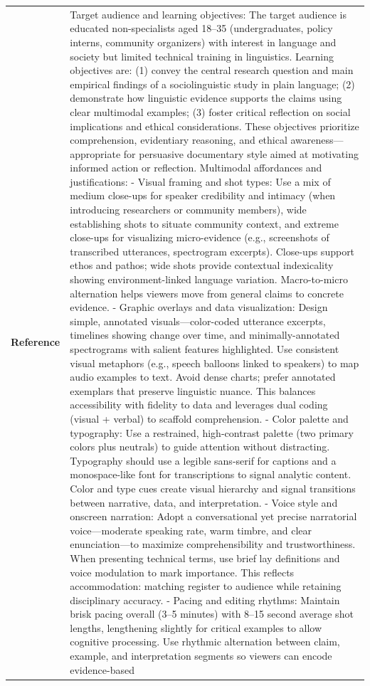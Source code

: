 \begin{longtable}{@{}l p{13cm}@{}}
  \textbf{Reference} & Target audience and learning objectives: The target audience is educated non-specialists aged 18--35 (undergraduates, policy interns, community organizers) with interest in language and society but limited technical training in linguistics. Learning objectives are: (1) convey the central research question and main empirical findings of a sociolinguistic study in plain language; (2) demonstrate how linguistic evidence supports the claims using clear multimodal examples; (3) foster critical reflection on social implications and ethical considerations. These objectives prioritize comprehension, evidentiary reasoning, and ethical awareness---appropriate for persuasive documentary style aimed at motivating informed action or reflection. \newline Multimodal affordances and justifications: \newline - Visual framing and shot types: Use a mix of medium close-ups for speaker credibility and intimacy (when introducing researchers or community members), wide establishing shots to situate community context, and extreme close-ups for visualizing micro-evidence (e.g., screenshots of transcribed utterances, spectrogram excerpts). Close-ups support ethos and pathos; wide shots provide contextual indexicality showing environment-linked language variation. Macro-to-micro alternation helps viewers move from general claims to concrete evidence. \newline - Graphic overlays and data visualization: Design simple, annotated visuals---color-coded utterance excerpts, timelines showing change over time, and minimally-annotated spectrograms with salient features highlighted. Use consistent visual metaphors (e.g., speech balloons linked to speakers) to map audio examples to text. Avoid dense charts; prefer annotated exemplars that preserve linguistic nuance. This balances accessibility with fidelity to data and leverages dual coding (visual + verbal) to scaffold comprehension. \newline - Color palette and typography: Use a restrained, high-contrast palette (two primary colors plus neutrals) to guide attention without distracting. Typography should use a legible sans-serif for captions and a monospace-like font for transcriptions to signal analytic content. Color and type cues create visual hierarchy and signal transitions between narrative, data, and interpretation. \newline - Voice style and onscreen narration: Adopt a conversational yet precise narratorial voice---moderate speaking rate, warm timbre, and clear enunciation---to maximize comprehensibility and trustworthiness. When presenting technical terms, use brief lay definitions and voice modulation to mark importance. This reflects accommodation: matching register to audience while retaining disciplinary accuracy. \newline - Pacing and editing rhythms: Maintain brisk pacing overall (3--5 minutes) with 8--15 second average shot lengths, lengthening slightly for critical examples to allow cognitive processing. Use rhythmic alternation between claim, example, and interpretation segments so viewers can encode evidence-based 
\end{longtable}
